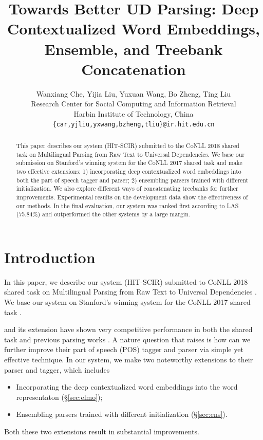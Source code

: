\documentclass[11pt,a4paper]{article}
\title{Towards Better UD Parsing: Deep Contextualized Word Embeddings, Ensemble, and Treebank Concatenation}
\author{Wanxiang Che, Yijia Liu, Yuxuan Wang, Bo Zheng, Ting Liu \\
	Research Center for Social Computing and Information Retrieval \\
	Harbin Institute of Technology, China \\
	{\tt \{car,yjliu,yxwang,bzheng,tliu\}@ir.hit.edu.cn}	}
\date{}
\begin{document}
\maketitle

\newcommand{\udst}[0]{\emph{CoNLL 2018 UD Shared Task}}

\begin{abstract}
This paper describes our system (HIT-SCIR)
submitted to the  CoNLL 2018 shared
task on Multilingual Parsing from Raw Text to 
Universal Dependencies.
We base our submission on Stanford's winning system for the CoNLL 2017 shared task
and make two effective extensions: 
1) incorporating deep contextualized
word embeddings into both the part of speech
tagger and parser;
2) ensembling parsers trained with different initialization.
We also explore different ways of concatenating treebanks
for further improvements.
Experimental results on the development data
show the effectiveness of our methods.
In the final evaluation,
our system was ranked first according to LAS (75.84\%)
and outperformed the other systems by a large margin.

\end{abstract}

\section{Introduction}

In this paper, we describe our system (HIT-SCIR) submitted to CoNLL 2018 shared
task on Multilingual Parsing from Raw Text to 
Universal Dependencies \cite{udst:overview}.
We base our system on Stanford's winning system \citep[\S\ref{sec:biaffine}]{dozat-qi-manning:2017:K17-3}
for the CoNLL 2017 shared task \cite{udst:overview2017}.

\citet{DBLP:journals/corr/DozatM16} and
its extension \cite{dozat-qi-manning:2017:K17-3} have
shown very competitive performance in both the shared task \cite{dozat-qi-manning:2017:K17-3}
and previous parsing works \cite{ma-hovy:2017:I17-1,shi-huang-lee:2017:EMNLP2017,N18-1088,DBLP:journals/corr/abs-1805-01087}.
A nature question that raises is how can we further improve
their part of speech (POS) tagger and parser
via simple yet effective technique.
In our system, we make two noteworthy extensions to their parser and tagger,
which includes
\begin{itemize}
	\item Incorporating the deep contextualized word embeddings \cite[ELMo]{N18-1202} into the word representaton (\S\ref{sec:elmo});
	\item Ensembling parsers trained with different initialization (\S\ref{sec:ens}).
\end{itemize}
Both these two extensions result in substantial improvements. 
\end{document}
